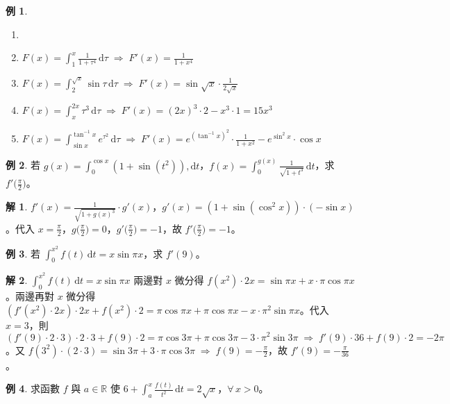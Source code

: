 \documentclass[12pt]{extarticle}
\newcommand{\ds}{\displaystyle}
\newcommand{\ie}{\;\Longrightarrow\;}
\theoremstyle{definition}
\newtheorem*{ex}{例}
\newtheorem*{sol}{解}
\begin{document}
\begin{ex} 
  \begin{enumerate}\setlength{\itemsep}{0pt}
    \item[]
    \item $\ds F(x) = \int_1^x\frac{1}{1 + \tau^4}\,\mathrm{d}\tau \ie F'(x) = \frac{1}{1 + x^4}$ 
    \item $\ds F(x) = \int_2^{\sqrt{x}}\sin\tau\,\mathrm{d}\tau \ie F'(x) = \sin\sqrt{x}\cdot\frac{1}{2\sqrt{x}}$
    \item $\ds F(x) = \int_{x}^{2x}\tau^3\,\mathrm{d}\tau \ie F'(x) = (2x)^3\cdot 2 - x^3\cdot 1 = 15x^3$
    \item $\ds F(x) = \int_{\sin x}^{\tan^{-1}x}e^{\tau^2}\,\mathrm{d}\tau \ie F'(x) = e^{(\tan^{-1}x)^2}\cdot\frac{1}{1 + x^2} - e^{\sin^2 x}\cdot\cos x$
  \end{enumerate}
\end{ex}

\begin{ex}
  若 $\ds g(x) = \int_0^{\cos x}(1 + \sin(t^2)),\text{d}t$，$\ds f(x) = \int_0^{g(x)}\frac{1}{\sqrt{1 + t^3}}\,\text{d}t$，求 $\ds f'\big(\frac{\pi}{2}\big)$。
\end{ex}

\begin{sol}
  $\ds f'(x) = \frac{1}{\sqrt{1 + g(x)^3}}\cdot g'(x)$，$\ds g'(x) = (1 + \sin(\cos^2 x))\cdot(-\sin x)$。代入 $\ds x=\frac{\pi}{2}$，$\ds g\big(\frac{\pi}{2}\big) = 0$，$\ds g'\big(\frac{\pi}{2}\big) = -1$，故 $\ds f'\big(\frac{\pi}{2}\big) = -1$。 
\end{sol}

\begin{ex}
  若 $\ds\int_0^{x^2} f(t)\,\text{d}t = x\sin\pi x$，求 $f'(9)$。
\end{ex}

\begin{sol}
  $\ds\int_0^{x^2} f(t)\,\text{d}t = x\sin\pi x$ 兩邊對 $x$ 微分得 $\ds f(x^2)\cdot 2x = \sin\pi x + x\cdot\pi\cos\pi x$。兩邊再對 $x$ 微分得 $\ds (f'(x^2)\cdot 2x)\cdot 2x + f(x^2)\cdot 2 = \pi\cos\pi x + \pi\cos\pi x - x\cdot\pi^2\sin\pi x$。代入 $x = 3$，則 $\ds (f'(9)\cdot 2\cdot 3)\cdot 2\cdot 3 + f(9)\cdot 2 = \pi\cos3\pi + \pi\cos3\pi - 3\cdot\pi^2\sin3\pi \ie f'(9)\cdot 36 + f(9)\cdot 2 = -2\pi$。又 $\ds f(3^2)\cdot(2\cdot 3) = \sin 3\pi + 3\cdot\pi\cos3\pi\ie f(9) = -\frac{\pi}{2}$，故 $\ds f'(9) = -\frac{\pi}{36}$。 
\end{sol}

\begin{ex}
  求函數 $f$ 與 $a\in\mathbb{R}$ 使 $\ds 6 + \int_a^x\frac{f(t)}{t^2}\,\text{d}t = 2\sqrt{x}$，$\forall\,x > 0$。 
\end{ex}
\end{document}

